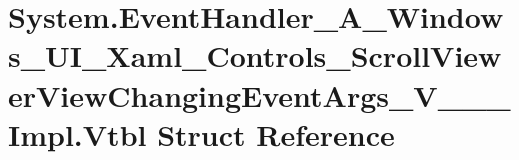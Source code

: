 \hypertarget{struct_system_1_1_event_handler___a___windows___u_i___xaml___controls___scroll_viewer_view_chang628699d11d7aafe20e51b1c40740a5dc}{}\section{System.\+Event\+Handler\+\_\+\+A\+\_\+\+Windows\+\_\+\+U\+I\+\_\+\+Xaml\+\_\+\+Controls\+\_\+\+Scroll\+Viewer\+View\+Changing\+Event\+Args\+\_\+\+V\+\_\+\+\_\+\+\_\+\+Impl.\+Vtbl Struct Reference}
\label{struct_system_1_1_event_handler___a___windows___u_i___xaml___controls___scroll_viewer_view_chang628699d11d7aafe20e51b1c40740a5dc}
